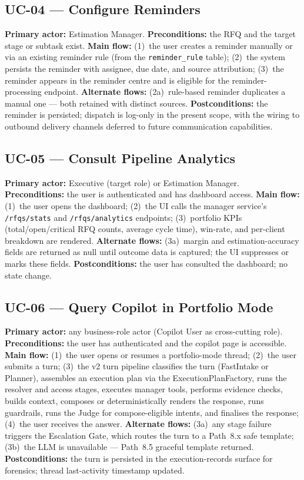 \subsection{UC-04 --- Configure Reminders}
\textbf{Primary actor:} Estimation Manager. \textbf{Preconditions:} the RFQ and the target stage or subtask exist. \textbf{Main flow:} (1)~the user creates a reminder manually or via an existing reminder rule (from the \texttt{reminder\_rule} table); (2)~the system persists the reminder with assignee, due date, and source attribution; (3)~the reminder appears in the reminder centre and is eligible for the reminder-processing endpoint. \textbf{Alternate flows:} (2a)~rule-based reminder duplicates a manual one --- both retained with distinct sources. \textbf{Postconditions:} the reminder is persisted; dispatch is log-only in the present scope, with the wiring to outbound delivery channels deferred to future communication capabilities.

\subsection{UC-05 --- Consult Pipeline Analytics}
\textbf{Primary actor:} Executive (target role) or Estimation Manager. \textbf{Preconditions:} the user is authenticated and has dashboard access. \textbf{Main flow:} (1)~the user opens the dashboard; (2)~the UI calls the manager service's \texttt{/rfqs/stats} and \texttt{/rfqs/analytics} endpoints; (3)~portfolio KPIs (total/open/critical RFQ counts, average cycle time), win-rate, and per-client breakdown are rendered. \textbf{Alternate flows:} (3a)~margin and estimation-accuracy fields are returned as null until outcome data is captured; the UI suppresses or marks these fields. \textbf{Postconditions:} the user has consulted the dashboard; no state change.

\subsection{UC-06 --- Query Copilot in Portfolio Mode}
\textbf{Primary actor:} any business-role actor (Copilot User as cross-cutting role). \textbf{Preconditions:} the user has authenticated and the copilot page is accessible. \textbf{Main flow:} (1)~the user opens or resumes a portfolio-mode thread; (2)~the user submits a turn; (3)~the v2 turn pipeline classifies the turn (FastIntake or Planner), assembles an execution plan via the ExecutionPlanFactory, runs the resolver and access stages, executes manager tools, performs evidence checks, builds context, composes or deterministically renders the response, runs guardrails, runs the Judge for compose-eligible intents, and finalises the response; (4)~the user receives the answer. \textbf{Alternate flows:} (3a)~any stage failure triggers the Escalation Gate, which routes the turn to a Path~8.x safe template; (3b)~the LLM is unavailable --- Path~8.5 graceful template returned. \textbf{Postconditions:} the turn is persisted in the execution-records surface for forensics; thread last-activity timestamp updated.

